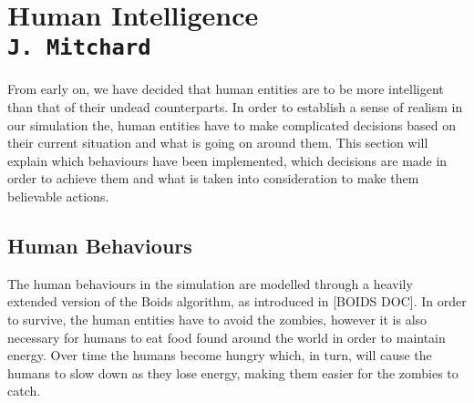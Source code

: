 \pagestyle{empty}



\section{Human Intelligence\\{\small\tt J.~Mitchard}}
From early on, we have decided that human entities are to be more intelligent than that of their undead counterparts. In order to establish a sense of realism in our simulation the, human entities have to make complicated decisions based on their current situation and what is going on around them. This section will explain which behaviours have been implemented, which decisions are made in order to achieve them and what is taken into consideration to make them believable actions.

\subsection{Human Behaviours}
The human behaviours in the simulation are modelled through a heavily extended version of the Boids algorithm, as introduced in [BOIDS DOC]. In order to survive, the human entities have to avoid the zombies, however it is also necessary for humans to eat food found around the world in order to maintain energy. Over time the humans become hungry which, in turn, will cause the humans to slow down as they lose energy, making them easier for the zombies to catch.

